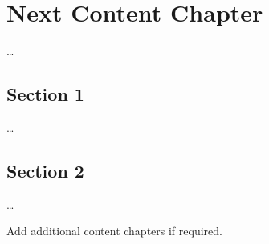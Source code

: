 \chapter{Next Content Chapter}
\label{ch:Content2}

\dots


\section{Section 1}
\label{ch:Content2:sec:Section1}

\dots


\section{Section 2}
\label{ch:Content2:sec:Section2}

\dots

Add additional content chapters if required. 